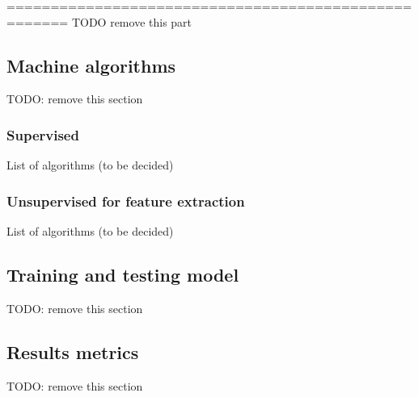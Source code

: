 =====================================================
TODO remove this part

\subsection{Machine algorithms}
TODO: remove this section
\subsubsection{Supervised}
List of algorithms (to be decided)
\subsubsection{Unsupervised for feature extraction}
List of algorithms (to be decided)
\subsection{Training and testing model}
TODO: remove this section
\cite{dns-traffic}
\subsection{Results metrics}
TODO: remove this section
\cite{fitting}